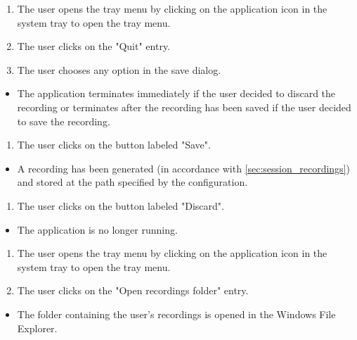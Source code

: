 \begin{tests}
    {\begin{enumerate}
        \item The \gls{user} opens the tray menu by clicking on the application icon in the system tray to open the tray menu.
        \item The \gls{user} clicks on the "Quit" entry.
        \item The \gls{user} chooses any option in the save dialog.
    \end{enumerate}}
    {\begin{itemize}
        \item The application terminates immediately if the \gls{user} decided to discard the recording or terminates after the recording has been saved if the \gls{user} decided to save the recording.
    \end{itemize}}
        
    {\begin{enumerate}
        \item The \gls{user} clicks on the button labeled "Save".
    \end{enumerate}}
    {\begin{itemize}
        \item A recording has been generated (in accordance with \ref{sec:session_recordings}) and stored at the path specified by the configuration.
    \end{itemize}}

    {\begin{enumerate}
        \item The \gls{user} clicks on the button labeled "Discard".
    \end{enumerate}}
    {\begin{itemize}
        \item The application is no longer running.
    \end{itemize}}
\newpage
    {\begin{enumerate}
        \item The \gls{user} opens the tray menu by clicking on the application icon in the system tray to open the tray menu.
        \item The \gls{user} clicks on the "Open recordings folder" entry.
    \end{enumerate}}
    {\begin{itemize}
        \item The folder containing the \gls{user}'s recordings is opened in the Windows File Explorer.
    \end{itemize}}
\end{tests}

